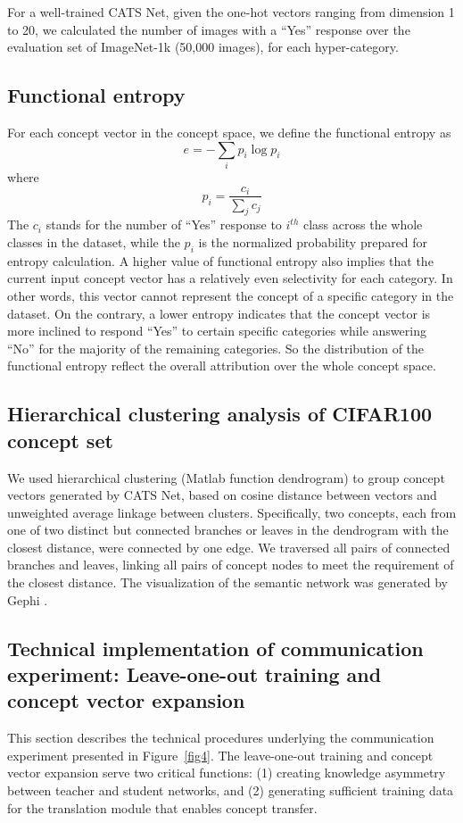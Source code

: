 \documentclass[pdflatex,sn-mathphys-num,lineno]{sn-jnl}%
\begin{document}
\begin{CJK}{UTF8}{gbsn}
For a well-trained CATS Net, given the one-hot vectors ranging from dimension 1 to 20, we calculated the number of images with a “Yes” response over the evaluation set of ImageNet-1k (50,000 images), for each hyper-category.

\subsection{Functional entropy}
For each concept vector in the concept space, we define the functional entropy as 
\[
\displaystyle e=-\sum_{i} p_i \log p_i
\]
where 
\[
\displaystyle p_i = \frac{c_i}{\sum_{j}c_j}
\]
The $c_i$ stands for the number of “Yes” response to $i^{th}$ class across the whole classes in the dataset, while the $p_i$ is the normalized probability prepared for entropy calculation. A higher value of functional entropy also implies that the current input concept vector has a relatively even selectivity for each category. In other words, this vector cannot represent the concept of a specific category in the dataset. On the contrary, a lower entropy indicates that the concept vector is more inclined to respond “Yes” to certain specific categories while answering “No” for the majority of the remaining categories. So the distribution of the functional entropy reflect the overall attribution over the whole concept space.

\subsection{Hierarchical clustering analysis of CIFAR100 concept set}
We used hierarchical clustering  (Matlab function dendrogram) to group concept vectors generated by CATS Net, based on cosine distance between vectors and unweighted average linkage between clusters. Specifically, two concepts, each from one of two distinct but connected branches or leaves in the dendrogram with the closest distance, were connected by one edge. We traversed all pairs of connected branches and leaves, linking all pairs of concept nodes to meet the requirement of the closest distance. The visualization of the semantic network was generated by Gephi \cite{bastian_gephi_2009}.

\subsection{Technical implementation of communication experiment: Leave-one-out training and concept vector expansion}
This section describes the technical procedures underlying the communication experiment presented in Figure~\ref{fig4}. The leave-one-out training and concept vector expansion serve two critical functions: (1) creating knowledge asymmetry between teacher and student networks, and (2) generating sufficient training data for the translation module that enables concept transfer.


\end{CJK}
\end{document}
